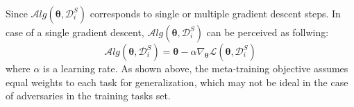Since $\mathcal{A}lg(\boldsymbol{\theta}, \mathcal{D}_{i}^{S})$ corresponds to single or multiple gradient descent steps. In case of a single gradient descent, $\mathcal{A}lg(\boldsymbol{\theta}, \mathcal{D}_{i}^{S})$ can be perceived as follwing:
\begin{equation}
\label{param-adaptation}  \mathcal{A}lg(\boldsymbol{\theta}, \mathcal{D}_{i}^{S}) = \boldsymbol{\theta} - \alpha \nabla_{\boldsymbol{\theta}}\mathcal{L}(\boldsymbol{\theta}, \mathcal{D}_{i}^{S})
\end{equation}
where $\alpha $ is a learning rate.
As shown above, the meta-training objective assumes equal weights to each task for generalization, which may not be ideal in the case of adversaries in the training tasks set.